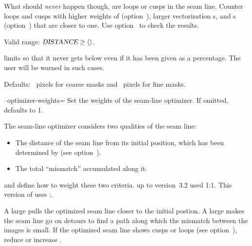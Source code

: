 \begin{codelist}
  What should \emph{never} happen though, are loops or cusps in the seam line.
  Counter loops and cusps with higher weights of
   (option~),
  larger vectorization s, and s
  (option~) that are closer to one.  Use
  option~ to check the results.

  Valid range: $\metavar{DISTANCE} \geq
  \val{val:minimum-vectorize-distance}$.

  \App{} limits  so that it never gets below
   even if it has been given as a
  percentage.  The user will be warned in such cases.

  Defaults: ~pixels for
  coarse masks and ~pixels
  for fine masks.


  \label{opt:optimizer-weights}%
\item[--optimizer-weights=\metavar{DISTANCE-WEIGHT}\optional{:\metavar{MISMATCH-WEIGHT}}]\itemend
  Set the weights
  of the seam-line optimizer. If omitted,
   defaults to 1.

  The seam-line optimizer considers two qualities of the seam line:
  \begin{itemize}
  \item
    The distance of the seam line from its initial position, which has
    been determined by  (see
    option~).
  \item
    The total ``mismatch'' accumulated along it.
  \end{itemize}

   and  define
  how to weight these two criteria.  \App{} up to version~3.2 used
  1:1.  This version of \App{} uses
  :.

  A large  pulls the optimized seam line
  closer to the initial postion.  A large
   makes the seam line go on detours to
  find a path along which the mismatch between the images is small.
  If the optimized seam line shows cusps or loops (see
  option~), reduce 
  or increase .


\end{codelist}
